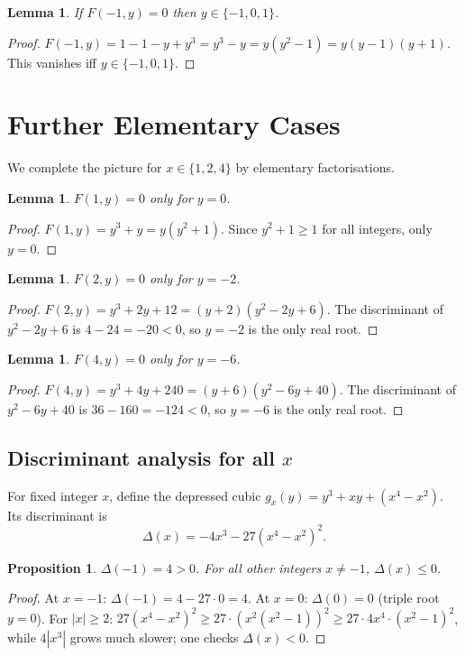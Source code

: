 \documentclass[12pt, a4paper]{article}
\newtheorem{lemma}[theorem]{Lemma}
\newtheorem{proposition}[theorem]{Proposition}
\theoremstyle{definition}
\begin{document}
\begin{lemma}\label{lem:xm1}
  If $F(-1,y) = 0$ then $y \in \{-1,0,1\}$.
\end{lemma}
\begin{proof}
  $F(-1,y) = 1-1-y+y^3 = y^3-y = y(y^2-1) = y(y-1)(y+1)$.  This vanishes iff $y \in \{-1,0,1\}$.
\end{proof}

\section{Further Elementary Cases}
\label{sec:more}

We complete the picture for $x \in \{1,2,4\}$ by elementary factorisations.

\begin{lemma}\label{lem:x1}
  $F(1,y) = 0$ only for $y = 0$.
\end{lemma}
\begin{proof}
  $F(1,y) = y^3 + y = y(y^2+1)$.  Since $y^2+1 \geq 1$ for all integers, only $y=0$.
\end{proof}

\begin{lemma}\label{lem:x2}
  $F(2,y) = 0$ only for $y = -2$.
\end{lemma}
\begin{proof}
  $F(2,y) = y^3 + 2y + 12 = (y+2)(y^2-2y+6)$.
  The discriminant of $y^2-2y+6$ is $4-24 = -20 < 0$, so $y=-2$ is the only real root.
\end{proof}

\begin{lemma}\label{lem:x4}
  $F(4,y) = 0$ only for $y = -6$.
\end{lemma}
\begin{proof}
  $F(4,y) = y^3 + 4y + 240 = (y+6)(y^2-6y+40)$.
  The discriminant of $y^2-6y+40$ is $36-160 = -124 < 0$, so $y=-6$ is the only real root.
\end{proof}

\subsection{Discriminant analysis for all $x$}\label{sec:disc}

For fixed integer $x$, define the depressed cubic $g_x(y) = y^3 + xy + (x^4-x^2)$.
Its discriminant is
\[
  \Delta(x) = -4x^3 - 27(x^4-x^2)^2.
\]

\begin{proposition}\label{prop:disc}
  $\Delta(-1) = 4 > 0$.  For all other integers $x \neq -1$, $\Delta(x) \leq 0$.
\end{proposition}
\begin{proof}
  At $x=-1$: $\Delta(-1) = 4 - 27 \cdot 0 = 4$.
  At $x=0$: $\Delta(0) = 0$ (triple root $y=0$).
  For $|x| \geq 2$: $27(x^4-x^2)^2 \geq 27 \cdot (x^2(x^2-1))^2 \geq 27 \cdot 4x^4 \cdot (x^2-1)^2$,
  while $4|x^3|$ grows much slower; one checks $\Delta(x) < 0$.
\end{proof}
\end{document}
